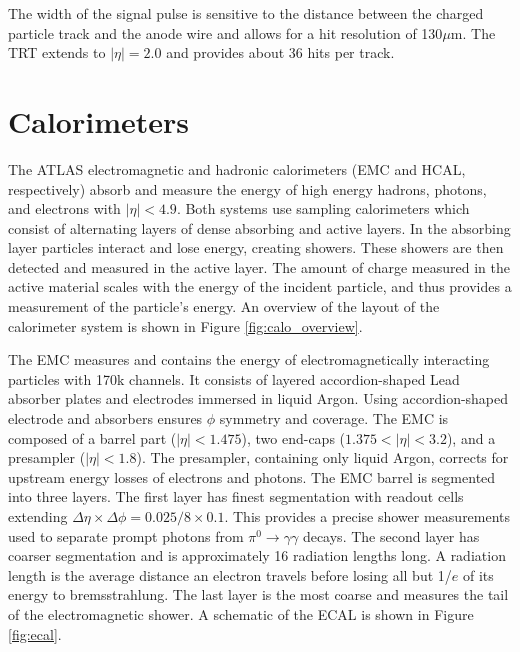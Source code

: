 The width of the signal pulse is sensitive to the distance between the charged particle track and the anode wire and allows for a hit resolution of 130$\mu$m. The TRT extends to $|\eta| = 2.0$ and provides about 36 hits per track.
\section{Calorimeters}
The ATLAS electromagnetic and hadronic calorimeters (EMC and HCAL, respectively) absorb and measure the energy of high energy hadrons, photons, and electrons with $|\eta| < 4.9$. Both systems use sampling calorimeters which consist of alternating layers of dense absorbing and active layers. In the absorbing layer particles interact and lose energy, creating showers. These showers are then detected and measured in the active layer. The amount of charge measured in the active material scales with the energy of the incident particle, and thus provides a measurement of the particle's energy. An overview of the layout of the calorimeter system is shown in Figure \ref{fig:calo_overview}.

The EMC measures and contains the energy of electromagnetically interacting particles with 170k channels. It consists of layered accordion-shaped Lead absorber plates and electrodes immersed in liquid Argon. Using accordion-shaped electrode and absorbers ensures $\phi$ symmetry and coverage. The EMC is composed of a barrel part ($|\eta| < 1.475$), two end-caps ($1.375<|\eta| < 3.2$), and a presampler ($|\eta| < 1.8$).  The presampler, containing only liquid Argon, corrects for upstream energy losses of electrons and photons. The EMC barrel is segmented into three layers. The first layer has finest segmentation with readout cells extending $\Delta \eta \times \Delta \phi = 0.025/8 \times 0.1$. This provides a precise shower measurements used to separate prompt photons from $\pi^{0} \rightarrow \gamma \gamma$ decays. The second layer has coarser segmentation and is approximately 16 radiation lengths long. A radiation length is the average distance an electron travels before losing all but 1/$e$ of its energy to bremsstrahlung. The last layer is the most coarse and measures the tail of the electromagnetic shower. A schematic of the ECAL is shown in Figure \ref{fig:ecal}. 

